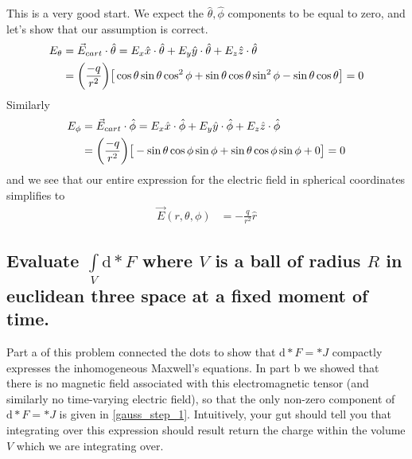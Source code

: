 %
This is a very good start. We expect the $\hat{\theta}, \hat{\phi}$ components to be equal to zero, and let's show that our assumption is correct.
%
\begin{align}
	E_{\theta} &= \vec{E}_{cart} \cdot \hat{\theta} = E_x \hat{x} \cdot \hat{\theta} + E_y \hat{y} \cdot \hat{\theta} + E_z \hat{z} \cdot \hat{\theta} \notag \\ 
	&= \bigg( \frac{-q}{r^2} \bigg) \big[ \cos{\theta} \sin{\theta} \cos^2{\phi} + \sin{\theta} \cos{\theta} \sin^2{\phi} - \sin{\theta} \cos{\theta} \big] = 0
\end{align}
%
Similarly
%
\begin{align}
	E_{\phi} &= \vec{E}_{cart} \cdot \hat{\phi} = E_x \hat{x} \cdot \hat{\phi} + E_y \hat{y} \cdot \hat{\phi} + E_z \hat{z} \cdot \hat{\phi} \notag \\ 
	&= \bigg( \frac{-q}{r^2} \bigg) \big[ - \sin{\theta} \cos{\phi} \sin{\phi} + \sin{\theta} \cos{\phi} \sin{\phi} + 0 \big] = 0
\end{align}
%
and we see that our entire expression for the electric field in spherical coordinates simplifies to 
%
\begin{align}
	\vec{E}(r, \theta, \phi) &= - \frac{q}{r^2} \hat{r}
\end{align}
%

\subsection{Evaluate $ \int\limits_{V} \textrm{d} \ast F $ where $V$ is a ball of radius $R$ in euclidean three space at a fixed moment of time.}
Part a of this problem connected the dots to show that $ \textrm{d} \ast F = \ast J $ compactly expresses the inhomogeneous Maxwell's equations. In part b we showed that there is no magnetic field associated with this electromagnetic tensor (and similarly no time-varying electric field), so that the only non-zero component of $ \textrm{d} \ast F = \ast J $ is given in \ref{gauss_step_1}. Intuitively, your gut should tell you that integrating over this expression should result return the charge within the volume $V$ which we are integrating over. 

